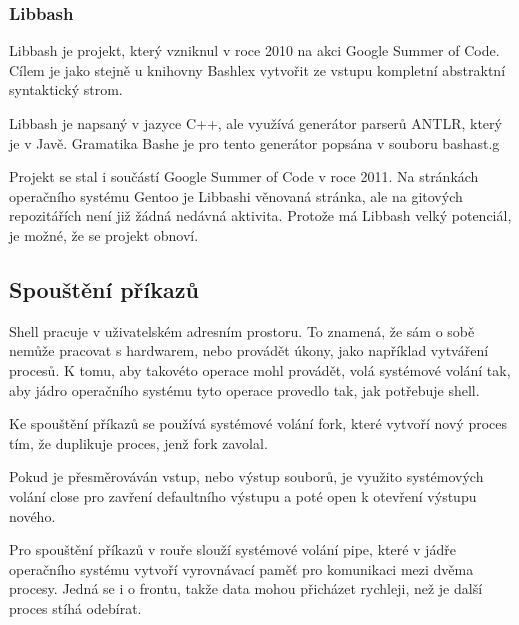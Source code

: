 \documentclass[thesis=M,czech]{FITthesis}[2012/06/26]
\begin{document}
%
%
%
\subsubsection{Libbash}

Libbash je projekt, který vzniknul v roce 2010 na akci Google Summer of Code. Cílem je jako stejně u knihovny Bashlex vytvořit ze vstupu kompletní abstraktní syntaktický strom.

Libbash je napsaný v jazyce C++, ale využívá generátor parserů ANTLR, který je v Javě. Gramatika Bashe je pro tento generátor popsána v souboru bashast.g

Projekt se stal i součástí Google Summer of Code v roce 2011. Na stránkách operačního systému Gentoo je Libbashi věnovaná stránka, ale na gitových repozitářích není již žádná nedávná aktivita. Protože má Libbash velký potenciál, je možné, že se projekt obnoví.





%
%
%
\subsection{Spouštění příkazů}\label{sec:exec}

Shell pracuje v uživatelském adresním prostoru. To znamená, že sám o sobě nemůže pracovat s hardwarem, nebo provádět úkony, jako například vytváření procesů. K tomu, aby takovéto operace mohl provádět, volá systémové volání tak, aby jádro operačního systému tyto operace provedlo tak, jak potřebuje shell.

Ke spouštění příkazů se používá systémové volání fork, které vytvoří nový proces tím, že duplikuje proces, jenž fork zavolal.

Pokud je přesměrováván vstup, nebo výstup souborů, je využito systémových volání close pro zavření defaultního výstupu a poté open k otevření výstupu nového.

Pro spouštění příkazů v rouře slouží systémové volání pipe, které v jádře operačního systému vytvoří vyrovnávací paměť pro komunikaci mezi dvěma procesy. Jedná se i o frontu, takže data mohou přicházet rychleji, než je další proces stíhá odebírat.
\end{document}
